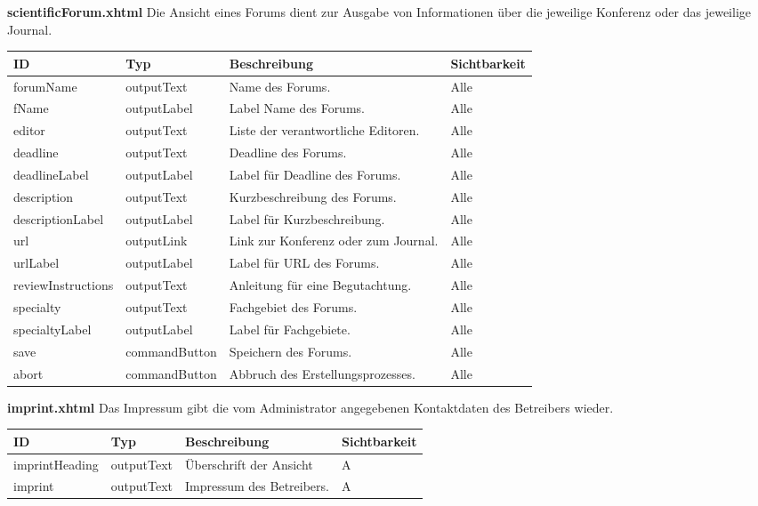 \textbf{scientificForum.xhtml} Die Ansicht eines Forums dient zur Ausgabe von Informationen über die jeweilige Konferenz oder das jeweilige Journal.

\begin{tabular}[H]{|m{2cm}|m{3cm}|m{6cm}|m{2.5cm}|}
    \hline
    \textbf{ID} & \textbf{Typ} & \textbf{Beschreibung} & \textbf{Sichtbarkeit} \\
    \hline
    \hline
    forumName & outputText & Name des Forums. & Alle\\
    \hline
    fName & outputLabel & Label Name des Forums. & Alle\\
    \hline
    editor & outputText & Liste der verantwortliche Editoren. & Alle\\
    \hline
    deadline & outputText & Deadline des Forums. & Alle\\
    \hline
    deadlineLabel & outputLabel & Label für Deadline des Forums. & Alle\\
    \hline
    description & outputText & Kurzbeschreibung des Forums. & Alle\\
    \hline
    descriptionLabel & outputLabel & Label für Kurzbeschreibung. & Alle\\
    \hline
    url & outputLink & Link zur Konferenz oder zum Journal. & Alle\\
    \hline
    urlLabel & outputLabel & Label für URL des Forums. & Alle\\
    \hline
    reviewInstructions  & outputText & Anleitung für eine Begutachtung. & Alle\\
    \hline
    specialty & outputText & Fachgebiet des Forums. & Alle\\
    \hline
    specialtyLabel & outputLabel & Label für Fachgebiete. & Alle\\
    \hline
    save & commandButton & Speichern des Forums. & Alle\\
    \hline
    abort & commandButton & Abbruch des Erstellungsprozesses. & Alle\\
    \hline
\end{tabular}

\textbf{imprint.xhtml} Das Impressum gibt die vom Administrator angegebenen Kontaktdaten des Betreibers wieder.

\begin{tabular}[H]{|m{2cm}|m{3cm}|m{6cm}|m{2.5cm}|}
    \hline
    \textbf{ID} & \textbf{Typ} & \textbf{Beschreibung} & \textbf{Sichtbarkeit} \\
    \hline
    \hline
    imprintHeading & outputText & Überschrift der Ansicht & A\\
    \hline
    imprint & outputText & Impressum des Betreibers. & A\\
    \hline
\end{tabular}

